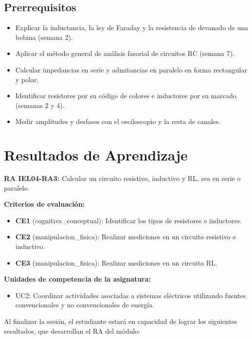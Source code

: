\documentclass[11pt,letterpaper]{article}
\begin{document}
\subsection{Prerrequisitos}

\begin{itemize}
  \item Explicar la inductancia, la ley de Faraday y la resistencia de devanado de una bobina (semana 2).
  \item Aplicar el método general de análisis fasorial de circuitos RC (semana 7).
  \item Calcular impedancias en serie y admitancias en paralelo en forma rectangular y polar.
  \item Identificar resistores por su código de colores e inductores por su marcado (semanas 2 y 4).
  \item Medir amplitudes y desfases con el osciloscopio y la resta de canales.
\end{itemize}

\section{Resultados de Aprendizaje}

\begin{alineacion}
\textbf{RA IEL04-RA3:} Calcular un circuito resistivo, inductivo y RL, sea en serie o paralelo.

\textbf{Criterios de evaluación:}

\begin{itemize}
  \item \textbf{CE1} (cognitiva\_conceptual): Identificar los tipos de resistores e inductores.
  \item \textbf{CE2} (manipulacion\_fisica): Realizar mediciones en un circuito resistivo e inductivo.
  \item \textbf{CE3} (manipulacion\_fisica): Realizar mediciones en un circuito RL.
\end{itemize}

\textbf{Unidades de competencia de la asignatura:}

\begin{itemize}
  \item UC2: Coordinar actividades asociadas a sistemas eléctricos utilizando fuentes convencionales y no convencionales de energía.
\end{itemize}
\end{alineacion}

Al finalizar la sesión, el estudiante estará en capacidad de lograr los siguientes resultados, que desarrollan el RA del módulo:
\end{document}

